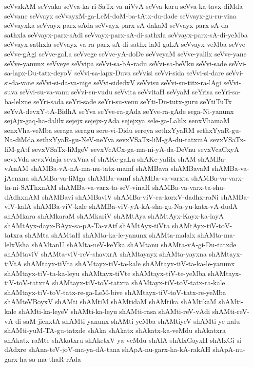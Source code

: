 {seVvakAM
seVvaka
seVva-ka-ri-SaTx-va-niVvA
seVva-karu
seVva-ka-tavx-diMda
seVvane
seVvayx
seVvayxM-ga-LeM-doM-ba-tAtx-du-dade
seVvayx-gu-ru-vina
seVvayxka
seVvayx-parx-sAda
seVvayx-parx-sA-dakaM
seVvayx-parx-sA-da-sathxla
seVvayx-parx-sAdi
seVvayx-parx-sA-di-sathxla
seVvayx-parx-sA-di-yeMba
seVvayx-sathxla
seVvayx-va-ra-parx-sA-di-sathx-laM-gaLA
seVvayx-veMba
seVve
seVve-gAgi
seVve-gaLa
seVvege
seVve-yA-doDe
seVveyaM
seVve-yalilx
seVve-yane
seVve-yanunx
seVveye
seVvipa
seVvi-sa-bA-radu
seVvi-sa-beVku
seVvi-sade
seVvi-sa-lapx-Du-tatx-deyoV
seVvi-sa-lapx-Duva
seVvisi
seVvi-sida
seVvi-si-dare
seVvi-si-da-vane
seVvi-si-da-va-nige
seVvi-sidedxV
seVvisu
seVvi-su-titx-ra-lAgi
seVvi-suva
seVvi-su-va-vanu
seVvi-su-vudu
seVvita
seVvitaH
seVyaM
seYrisa
seYri-sa-ba-lelxne
seYri-sada
seYri-sade
seYri-su-venu
seYti-Du-tutx-guru
seYtiTuTx
seYvA-devxY-tA-BidhA
seYva
seYve-ra-gAda
seYve-ra-gAde
sega-Ni-yanunx
sejAjx-gaq-ha-dalilx
sejejx
sejejx-yAda
sejejxya
sele-ga-Lalilx
senxVhamaM
senxVha-veMba
seraga
seragu
sere-vi-Didu
sereya
sethxYyaRM
sethxYyaR-gu-Na-diMda
sethxYyaR-gu-NeV-neYva
sevxVSaTx-liM-gA-du-tatxmA
sevxVSaTx-liM-gAtf
sevxVSaTx-liMgeV
sevxVcACx-ga-ma-ni-yA-da-DeVnu
sevxVcaCxyA
sevxVda
sevxVdaja
sevxVna
sf
shAKe-gaLu
shAKe-yalilx
shAM
shAMBa-vAnAM
shAMBa-vA-nA-ma-nu-tatx-mamf
shAMBava
shAMBavaM
shAMBa-va-jAcnxna
shAMBa-va-liMga
shAMBa-vamf
shAMBa-va-varxta
shAMBa-va-varx-ta-ni-SAThxnAM
shAMBa-va-varx-ta-seV-vinaH
shAMBa-va-varx-ta-shu-dAdhxnAM
shAMBavi
shAMBaviV
shAMBa-viV-ca-korxV-dadhx-raNi
shAMBa-viV-kalA
shAMBa-viV-kale
shAMBa-viV-yA-kA-sha-gu-Na-yu-katx-vA-dudA
shAMkara
shAMkaraM
shAMkariV
shAMtAya
shAMtAyx-Kayx-ka-layA
shAMtAyx-dayx-BAyx-sa-pA-Ta-vAtf
shAMtAyx-tiVta
shAMtAyx-tiV-toV-tatxra
shAMta
shAMtaH
shAMta-ka-le-yanunx
shAMta-malalx
shAMta-ma-lelxVsha
shAMtanU
shAMta-neV-keYka
shAMtanu
shAMta-vA-gi-Du-tatxde
shAMtaviV
shAMta-viV-reV-shavxrA
shAMtayayx
shAMta-yayxna
shAMtayx-tiVtA
shAMtayx-tiVta
shAMtayx-tiV-ta-kale
shAMtayx-tiV-ta-ka-le-yanunx
shAMtayx-tiV-ta-ka-leyu
shAMtayx-tiVte
shAMtayx-tiV-te-yeMba
shAMtayx-tiV-toV-tatxrA
shAMtayx-tiV-toV-tatxra
shAMtayx-tiV-toV-tatx-ra-kale
shAMtayx-tiV-toV-tatx-re-ga-LeM-bive
shAMtayx-tiV-toV-tatx-re-yeMba
shAMteVBoyxV
shAMti
shAMtiM
shAMtidaM
shAMtika
shAMtikaM
shAMti-kale
shAMti-ka-leyeV
shAMti-ka-leyu
shAMti-rasa
shAMti-reV-vAdi
shAMti-reV-vA-di-saM-jicnxtA
shAMti-yanunx
shAMti-yeMba
shAMtiyeV
shAMti-ye-nalu
shAMti-yuM-TA-gu-tatxde
shAka
shAkatx
shAkatx-ka-veMdu
shAkatxra
shAkatx-raMte
shAkatxru
shAketxV-ya-veMdu
shAlA
shAlxGayxH
shAlxGi-si-dAdxre
shAna-teV-joV-ma-ya-dA-tana
shApA-nu-garx-ha-kA-rakAH
shApA-nu-garx-ha-sa-ma-thaR-rAda
}

